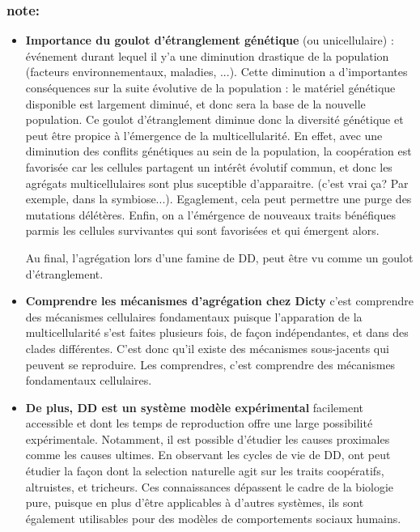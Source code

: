 \documentclass[twocolumn,10pt]{article} %
\begin{document}
                \subsubsection{note:}
                    \begin{itemize}
                        \item \textbf{Importance du goulot d'étranglement génétique} (ou unicellulaire) : événement durant lequel il y'a une diminution drastique de la population (facteurs
                        environnementaux, maladies, ...). Cette diminution a d'importantes conséquences sur la suite évolutive de la population : le matériel génétique disponible
                        est largement diminué, et donc sera la base de la nouvelle population.
                        Ce goulot d'étranglement diminue donc la diversité génétique et peut être propice à l'émergence de la multicellularité. En effet, avec une diminution des conflits
                        génétiques au sein de la population, la coopération est favorisée car les cellules partagent un intérêt évolutif commun, et donc les agrégats multicellulaires sont plus suceptible d'apparaitre.
                        (c'est vrai ça? Par exemple, dans la symbiose...).
                        Egaglement, cela peut permettre une purge des mutations délétères. 
                        Enfin, on a l'émérgence de nouveaux traits bénéfiques parmis les cellules survivantes qui sont favorisées et qui émergent alors.

                        Au final, l'agrégation lors d'une famine de DD, peut être vu comme un goulot d'étranglement. 


                        \item \textbf{Comprendre les mécanismes d'agrégation chez Dicty} c'est comprendre des mécanismes cellulaires fondamentaux puisque 
                        l'apparation de la multicellularité s'est faites plusieurs fois, de façon indépendantes, et dans des clades différentes.
                        C'est donc qu'il existe des mécanismes sous-jacents qui peuvent se reproduire. Les comprendres, c'est comprendre des mécanismes
                        fondamentaux cellulaires.

                        \item \textbf{De plus, DD est un système modèle expérimental} facilement accessible et dont les temps de reproduction offre une large possibilité
                        expérimentale. Notamment, il est possible d'étudier les causes proximales comme les causes ultimes. En observant les cycles de vie
                        de DD, ont peut étudier la façon dont la selection naturelle agit sur les traits coopératifs, altruistes, et tricheurs. Ces connaissances
                        dépassent le cadre de la biologie pure, puisque en plus d'être applicables à d'autres systèmes, ils sont également utilisables pour des modèles
                        de comportements sociaux humains.


\end{itemize}
\end{document}
